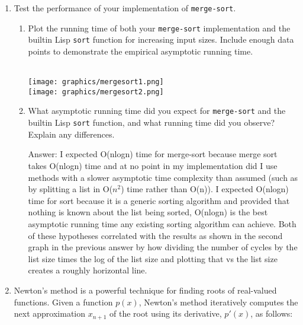 \documentclass[12pt,letterpaper]{ntdhw}
\begin{document}
\begin{enumerate}
\begin{enumerate}
  \end{enumerate}

  \item Test the performance of your implementation of
    \texttt{merge-sort}.
    \begin{enumerate}

    \item Plot the running time of both your \texttt{merge-sort}
      implementation and the builtin Lisp \texttt{sort} function for
      increasing input sizes.  Include enough data points to
      demonstrate the empirical asymptotic running time.

    \begin{emph}
      \\
      \texttt{[image: graphics/mergesort1.png]} 
      \\
      \texttt{[image: graphics/mergesort2.png]}
    \end{emph}

  \item What asymptotic running time did you expect for
    \texttt{merge-sort} and the builtin Lisp \texttt{sort} function, and
    what running time did you observe?  Explain any differences.

    \begin{emph}
      Answer: I expected O(nlogn) time for merge-sort because merge sort takes O(nlogn) time and at no point in my implementation did I use methods with a slower asymptotic time complexity than assumed (such as by splitting a list in O($n^2$) time rather than O(n)). I expected O(nlogn) time for sort because it is a generic sorting algorithm and provided that nothing is known about the list being sorted, O(nlogn) is the best asymptotic running time any existing sorting algorithm can achieve. Both of these hypotheses correlated with the results as shown in the second graph in the previous answer by how dividing the number of cycles by the list size times the log of the list size and plotting that vs the list size creates a roughly horizontal line.
    \end{emph}

    \end{enumerate}

    \item Newton's method is a powerful technique for finding roots of real-valued functions. Given a function \( p(x) \), Newton's method iteratively computes the next approximation \( x_{n+1} \) of the root using its derivative, \( p'(x) \), as follows:


\end{enumerate}
\end{document}
